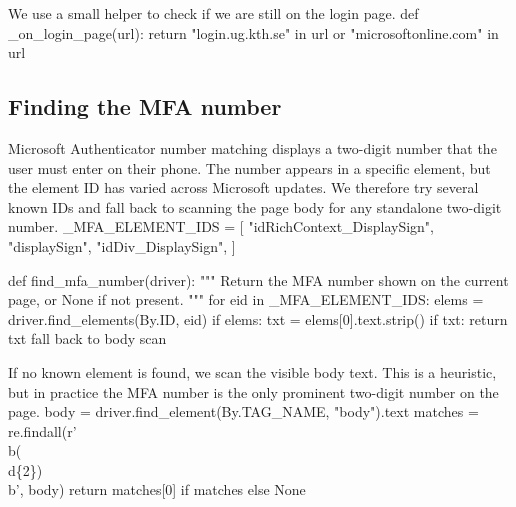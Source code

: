 We use a small helper to check if we are still on the login page.
\nwenddocs{}\plusendmoddef\nwstartdeflinemarkup{}\nwenddeflinemarkup
def _on_login_page(url):
  return "login.ug.kth.se" in url or "microsoftonline.com" in url
\nwendcode{}\nwdocspar

\subsection{Finding the MFA number}

Microsoft Authenticator number matching displays a two-digit number
that the user must enter on their phone.
The number appears in a specific element, but the element ID has varied
across Microsoft updates.
We therefore try several known IDs and fall back to scanning the page
body for any standalone two-digit number.
\nwenddocs{}\endmoddef\nwstartdeflinemarkup{}\nwenddeflinemarkup
_MFA_ELEMENT_IDS = [
  "idRichContext_DisplaySign",
  "displaySign",
  "idDiv_DisplaySign",
]

def find_mfa_number(driver):
  """
  Return the MFA number shown on the current page, or None if not present.
  """
  for eid in _MFA_ELEMENT_IDS:
    elems = driver.find_elements(By.ID, eid)
    if elems:
      txt = elems[0].text.strip()
      if txt:
        return txt
  \LA{}fall back to body scan~{\nwtagstyle{}}\RA{}
\nwendcode{}\nwdocspar

If no known element is found, we scan the visible body text.
This is a heuristic, but in practice the MFA number is the only
prominent two-digit number on the page.
\nwenddocs{}\endmoddef\nwstartdeflinemarkup{}\nwenddeflinemarkup
body = driver.find_element(By.TAG_NAME, "body").text
matches = re.findall(r'\\b(\\d\{2\})\\b', body)
return matches[0] if matches else None
\nwendcode{}\nwdocspar

